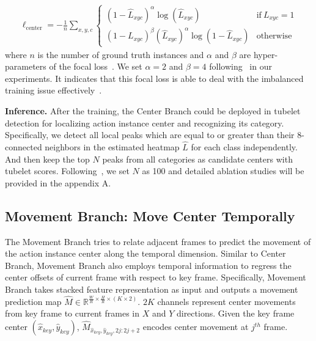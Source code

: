 \documentclass[runningheads]{llncs}
\begin{document}
\begin{equation}
  \begin{split}
  \ell_{\mathrm{center}}=-\frac{1}{n}
  \sum_{x,y,c}\left\{
      \begin{array}{lc}
      (1-\hat{L}_{xyc})^\alpha \log(\hat{L}_{xyc}) & \mathrm{if} \ L_{xyc}=1 \\
      (1-L_{xyc})^{\beta}(\hat{L}_{xyc})^\alpha \log(1-\hat{L}_{xyc}) & \mathrm{otherwise}
     \end{array}
  \right.
  \end{split}
  \end{equation}
where $n$ is the number of ground truth instances and $\alpha$ and $\beta$ are hyper-parameters of the focal loss~\cite{lin2017focal}. We set $\alpha=2$ and $\beta=4$ following~\cite{CornerNet,CenterNet} in our experiments. It indicates that this focal loss is able to deal with the imbalanced training issue effectively~\cite{lin2017focal}.

\textbf{Inference.} After the training, the Center Branch could be deployed in tubelet detection for localizing action instance center and recognizing its category. Specifically, we detect all local peaks which are equal to or greater than their 8-connected neighbors in the estimated heatmap $\hat{L}$ for each class independently. And then keep the top $N$ peaks from all categories as candidate centers with tubelet scores.
Following~\cite{CenterNet}, we set $N$ as 100 and detailed ablation studies will be provided in the appendix A.

\subsection{Movement Branch: Move Center Temporally}\label{sec:movementBranch}
\label{sec:movement}

The Movement Branch tries to relate adjacent frames to predict the movement of the action instance center along the temporal dimension. Similar to Center Branch, Movement Branch also employs temporal information to regress the center offsets of current frame with respect to key frame. Specifically, Movement Branch takes stacked feature representation as input and outputs a movement prediction map $\hat{M} \in \mathbb{R}^{\frac{W}{R}\times\frac{H}{R}\times(K\times 2)}$. $2K$ channels represent center movements from key frame to current frames in $X$ and $Y$ directions. Given the key frame center $(\hat{x}_{key},\hat{y}_{key})$, $\hat{M}_{\hat{x}_{key},\hat{y}_{key},2j:2j+2}$ encodes center movement at $j^{th}$ frame.
\end{document}
